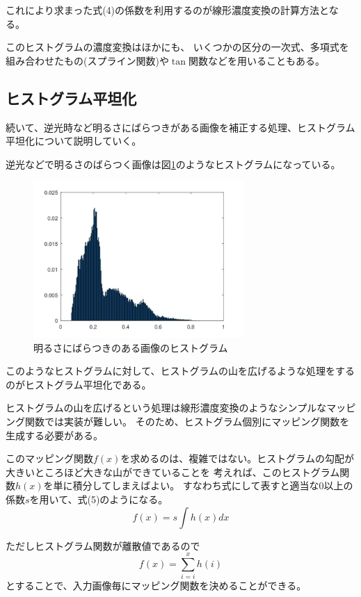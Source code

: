 \documentclass[a4paper,11pt,dvipdfmx]{jsarticle}
\begin{document}
これにより求まった式(4)の係数を利用するのが線形濃度変換の計算方法となる。

このヒストグラムの濃度変換はほかにも、
いくつかの区分の一次式、多項式を組み合わせたもの(スプライン関数)や$\tan$関数などを用いることもある。

\subsection{ヒストグラム平坦化}
続いて、逆光時など明るさにばらつきがある画像を補正する処理、ヒストグラム平坦化について説明していく。

逆光などで明るさのばらつく画像は図\ref{hist_2}のようなヒストグラムになっている。
\begin{figure}[htbp]
    \centering
    \includegraphics[width=80mm]{./img/flatten_ex.jpg}
    \caption{明るさにばらつきのある画像のヒストグラム}
    \label{hist_2}
\end{figure}

このようなヒストグラムに対して、ヒストグラムの山を広げるような処理をするのがヒストグラム平坦化である。

ヒストグラムの山を広げるという処理は線形濃度変換のようなシンプルなマッピング関数では実装が難しい。
そのため、ヒストグラム個別にマッピング関数を生成する必要がある。

このマッピング関数$f(x)$を求めるのは、複雑ではない。ヒストグラムの勾配が大きいところほど大きな山ができていることを
考えれば、このヒストグラム関数$h(x)$を単に積分してしまえばよい。
すなわち式にして表すと適当な0以上の係数$s$を用いて、式(5)のようになる。
\begin{equation}
    f(x) = s \int h(x)dx
\end{equation}

ただしヒストグラム関数が離散値であるので
\begin{equation}
    f(x) = \sum_{i=i}^{x}h(i)
\end{equation}
とすることで、入力画像毎にマッピング関数を決めることができる。
\end{document}
